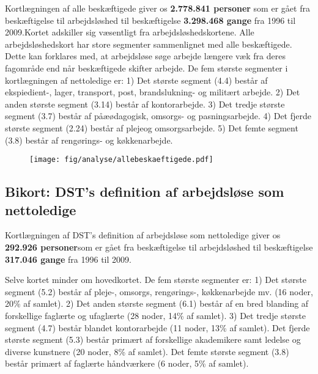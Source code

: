 Kortlægningen af alle beskæftigede giver os \textbf{2.778.841 personer} som er gået fra beskæftigelse til arbejdsløshed til beskæftigelse \textbf{3.298.468 gange} fra 1996 til 2009.Kortet adskiller sig væsentligt fra arbejdsløshedskortene.  Alle arbejdsløshedskort har store segmenter sammenlignet med alle beskæftigede. Dette kan forklares med, at arbejdsløse søge arbejde længere væk fra deres fagområde end når beskæftigede skifter arbejde. De fem største segmenter i kortlægningen af nettoledige er: 1) Det største segment (4.4) består af ekspiedient-, lager, transport, post, brandslukning- og militært arbejde. 2) Det anden største segment (3.14) består af kontorarbejde. 3) Det tredje største segment (3.7) består af påæødagogisk, omsorgs- og pasningsarbejde. 4) Det fjerde største segment (2.24) består af plejeog omsorgsarbejde. 5) Det  femte segment (3.8) består af rengørings- og køkkenarbejde.

\begin{figure}[H]
\begin{centering}
	\texttt{[image: fig/analyse/allebeskaeftigede.pdf]}
	\label{fig_hist_beskaeftigede_allekategorier132}
\end{centering}
\end{figure}


\newpage \subsection{Bikort: DST's definition af arbejdsløse som nettoledige \label{}}

Kortlægningen af DST's definition af arbejdsløse som nettoledige giver os \textbf{292.926 personer}som er gået fra beskæftigelse til arbejdsløshed til beskæftigelse \textbf{317.046 gange} fra 1996 til 2009.

Selve kortet minder om hovedkortet. De fem største segmenter er: 1) Det største segment (5.2) består af pleje-, omsorgs, rengørings-, køkkenarbejde mv. (16 noder, 20\% af samlet). 2) Det anden største segment (6.1) består af en bred blanding af forskellige faglærte og ufaglærte (28 noder, 14\% af samlet). 3) Det tredje største segment (4.7) består blandet kontorarbejde (11 noder, 13\% af samlet). Det fjerde største segment (5.3) består primært af forskellige akademikere samt ledelse og diverse kunstnere (20 noder, 8\% af samlet). Det femte største segment (3.8) består primært af faglærte håndværkere (6 noder, 5\% af samlet).

